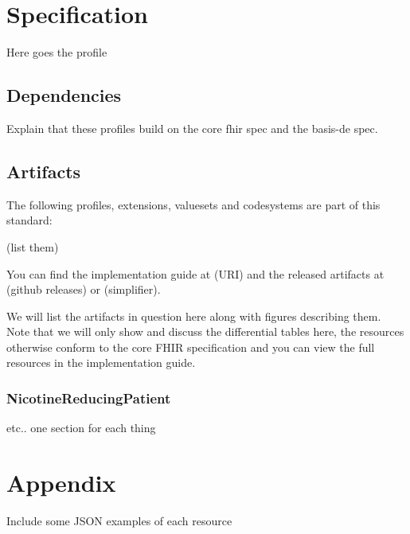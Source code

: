 \documentclass[12px]{report}
\begin{document}
\chapter{Specification}

Here goes the profile

\section{Dependencies}
Explain that these profiles build on the core fhir spec and the basis-de spec.

\section{Artifacts}
The following profiles, extensions, valuesets and codesystems are part of this standard:

(list them)

You can find the implementation guide at (URI) and the released artifacts at (github releases) or (simplifier).

We will list the artifacts in question here along with figures describing them. Note that we will only show and discuss the differential tables here, the resources otherwise conform to the core FHIR specification and you can view the full resources in the implementation guide.

\subsection{NicotineReducingPatient}

etc.. one section for each thing

\chapter{Appendix}

Include some JSON examples of each resource
\end{document}

